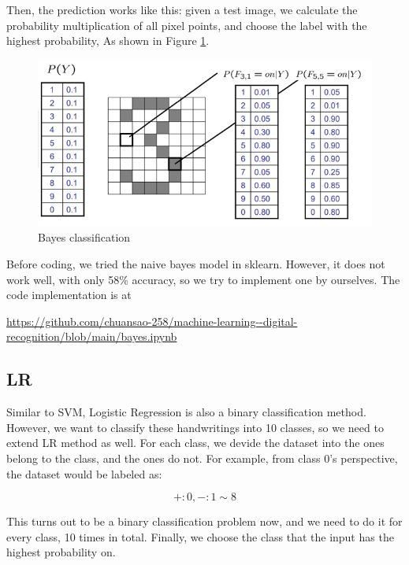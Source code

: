 \documentclass{article}
\begin{document}
	 Then, the prediction works like this: given a test image, we calculate the probability multiplication of all pixel points, and choose the label with the highest probability, As shown in Figure \ref{bayes}.
	 
	 \begin{figure}[htbp]
	 	\centering
	 	\includegraphics[scale=0.6]{1.png}
	 	\caption{Bayes classification}
	 	\label{bayes}
	 \end{figure}
	 
	 Before coding, we tried the naive bayes model in sklearn. However, it does not work well, with only 58\% accuracy, so we try to implement one by ourselves. The code implementation is at 
	 \begin{center}
	 	\url{https://github.com/chuansao-258/machine-learning--digital-recognition/blob/main/bayes.ipynb}
	 \end{center}
 	 
 	 \subsection{LR}
 	 
 	 Similar to SVM, Logistic Regression is also a binary classification method. However, we want to classify these handwritings into 10 classes, so we need to extend LR method as well. For each class, we devide the dataset into the ones belong to the class, and the ones do not. For example, from class $0$'s perspective, the dataset would be labeled as:
 	 
 	 \begin{equation}
 	 	+: 0, -: 1\sim 8
 	 \end{equation}
  
	This turns out to be a binary classification problem now, and we need to do it for every class, 10 times in total. Finally, we choose the class that the input has the highest probability on. 
	
\end{document}
